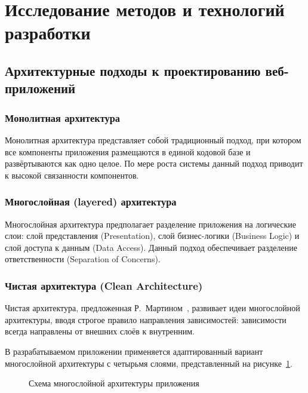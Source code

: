 \documentclass[a4paper,14pt]{extarticle}
\begin{document}
\section{Исследование методов и технологий разработки}

\subsection{Архитектурные подходы к проектированию веб-приложений}

\subsubsection{Монолитная архитектура}

Монолитная архитектура представляет собой традиционный подход, при котором все компоненты приложения размещаются в единой кодовой базе и развёртываются как одно целое. По мере роста системы данный подход приводит к высокой связанности компонентов.

\subsubsection{Многослойная (layered) архитектура}

Многослойная архитектура предполагает разделение приложения на логические слои: слой представления (Presentation), слой бизнес-логики (Business Logic) и слой доступа к данным (Data Access). Данный подход обеспечивает разделение ответственности (Separation of Concerns).

\subsubsection{Чистая архитектура (Clean Architecture)}

Чистая архитектура, предложенная Р.~Мартином~\cite{martin2018}, развивает идеи многослойной архитектуры, вводя строгое правило направления зависимостей: зависимости всегда направлены от внешних слоёв к внутренним.

В разрабатываемом приложении применяется адаптированный вариант многослойной архитектуры с четырьмя слоями, представленный на рисунке~\ref{fig:architecture}.

\begin{figure}[H]
\centering
{}
\caption{Схема многослойной архитектуры приложения}\label{fig:architecture}
\end{figure}
\end{document}
